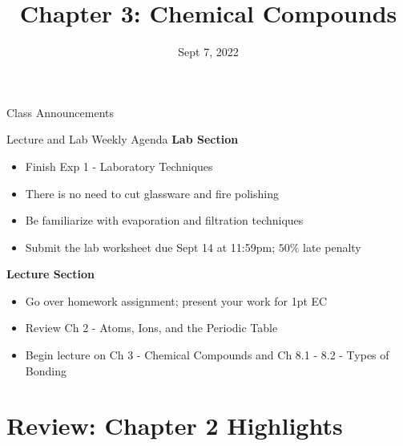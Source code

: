 \documentclass[11pt]{beamer}
\title{Chapter 3: Chemical Compounds}
\institute{Chemistry Department, Cypress College}
\date{Sept 7, 2022}
\begin{document}
\begin{frame}
  \titlepage
\end{frame}

\begin{frame}{Class Announcements}
\end{frame}

\begin{frame}{Lecture and Lab Weekly Agenda}
  \textbf{Lab Section}

  \begin{itemize}
  \item Finish Exp 1 - Laboratory Techniques
  \item There is no need to cut glassware and fire
    polishing
  \item Be familiarize with evaporation and filtration
    techniques
  \item Submit the lab worksheet due Sept 14 at 11:59pm;
    $50\%$ late penalty 
  \end{itemize}

  \textbf{Lecture Section}

  \begin{itemize}
  \item Go over homework assignment; present your work
    for 1pt EC
  \item Review Ch 2 - Atoms, Ions, and the Periodic Table
  \item Begin lecture on Ch 3 - Chemical Compounds and
    Ch 8.1 - 8.2 - Types of Bonding
  \end{itemize}
\end{frame}

\section{Review: Chapter 2 Highlights}
\end{document}
